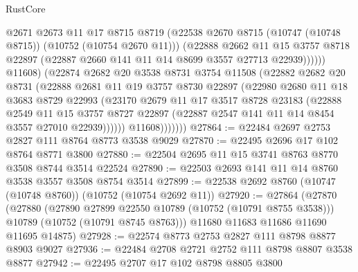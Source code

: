 \begin{lexlean}{RustCore}
\begin{coremodule}
                          @2671
                          @2673
                          @11
                          @17
                          @8715
                          @8719
                          (@22538 @2670 @8715 (@10747 (@10748 @8715)) (@10752 (@10754 @2670 @11)))
                          (@22888
                            @2662
                            @11
                            @15
                            @3757
                            @8718
                            @22897
                            (@22887 @2660 @141 @11 @14 @8699 @3557 @27713 @22939))))))
                  @11608)
                (@22874
                  @2682
                  @20
                  @3538
                  @8731
                  @3754
                  @11508
                  (@22882
                    @2682
                    @20
                    @8731
                    (@22888
                      @2681
                      @11
                      @19
                      @3757
                      @8730
                      @22897
                      (@22980
                        @2680
                        @11
                        @18
                        @3683
                        @8729
                        @22993
                        (@23170
                          @2679
                          @11
                          @17
                          @3517
                          @8728
                          @23183
                          (@22888
                            @2549
                            @11
                            @15
                            @3757
                            @8727
                            @22897
                            (@22887 @2547 @141 @11 @14 @8454 @3557 @27010 @22939))))))
                  @11608)))))))
@27864 := @22484 @2697 @2753 @2827 @111 @8764 @8773 @3538 @9029
@27870 := @22495 @2696 @17 @102 @8764 @8771 @3800
@27880 := @22504 @2695 @11 @15 @3741 @8763 @8770 @3508 @8744 @3514 @22524
@27890 := @22503 @2693 @141 @11 @14 @8760 @3538 @3557 @3508 @8754 @3514
@27899 := @22538 @2692 @8760 (@10747 (@10748 @8760)) (@10752 (@10754 @2692 @11))
@27920 := @27864
    (@27870
      (@27880
        (@27890 @27899 @22550 @10789 (@10752 (@10791 @8755 @3538)))
        @10789
        (@10752 (@10791 @8745 @8763)))
      @11680
      @11683
      @11686
      @11690
      @11695
      @14875)
@27928 := @22574 @8773 @2753 @2827 @111 @8798 @8877 @8903 @9027
@27936 := @22484 @2708 @2721 @2752 @111 @8798 @8807 @3538 @8877
@27942 := @22495 @2707 @17 @102 @8798 @8805 @3800

\end{coremodule}
\end{lexlean}
